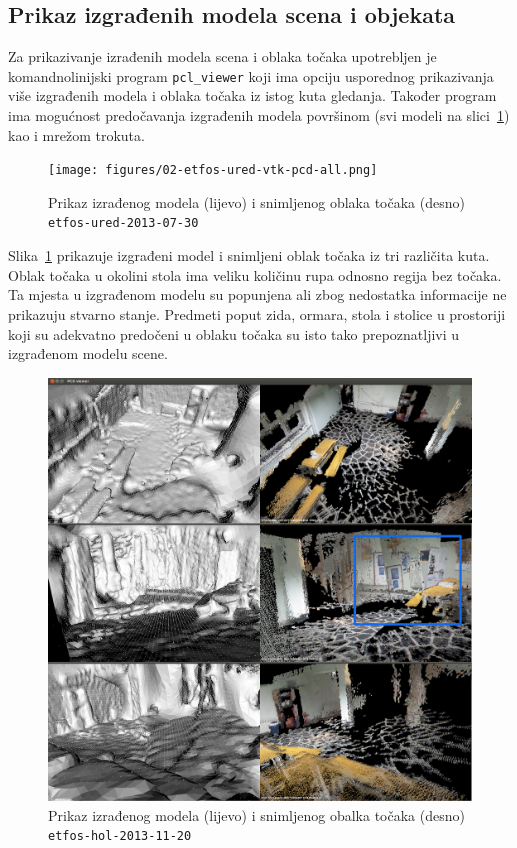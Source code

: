 \newpage
\subsection{Prikaz izgrađenih modela scena i objekata} %
\label{sub:Prikaz izgradenih modela scena i objekata}

Za prikazivanje izrađenih modela scena i oblaka točaka upotrebljen je
komandnolinijski program \texttt{pcl\_viewer} koji ima opciju usporednog
prikazivanja više izgrađenih modela i oblaka točaka iz istog kuta
gledanja. Također program ima mogućnost predočavanja izgrađenih modela
površinom (svi modeli na slici~\ref{fig:etfos-ured}) kao i mrežom
trokuta.

\begin{figure}[h]
\centering
\texttt{[image: figures/02-etfos-ured-vtk-pcd-all.png]}
\caption{Prikaz izrađenog modela (lijevo) i snimljenog oblaka točaka
(desno) \texttt{etfos-ured-2013-07-30}}
\label{fig:etfos-ured}
\end{figure}

Slika~\ref{fig:etfos-ured} prikazuje izgrađeni model i snimljeni oblak
točaka iz tri različita kuta. Oblak točaka u okolini stola ima veliku
količinu rupa odnosno regija bez točaka. Ta mjesta u izgrađenom modelu
su popunjena ali zbog nedostatka informacije ne prikazuju stvarno
stanje. Predmeti poput zida, ormara, stola i stolice u prostoriji koji
su adekvatno predočeni u oblaku točaka su isto tako prepoznatljivi u
izgrađenom modelu scene.

\newpage
\begin{figure}[h]
\centering
\includegraphics[scale=0.25]{figures/03-etfos-hol-vtk-pcd-all.png}
\caption{Prikaz izrađenog modela (lijevo) i snimljenog obalka točaka
(desno) \texttt{etfos-hol-2013-11-20}}
\label{fig:etfos-hol}
\end{figure}

